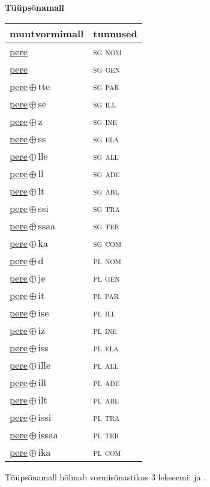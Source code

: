 

\vspace{3.5em}
\noindent \begin{minipage}{\textwidth}
\noindent \textbf{Tüüpsõnamall \,}\\

\begin{sideways}
\begin{tabular}{l l}
muutvormimall & tunnused \\
\hline
\underline{pere} & \textsc{ sg nom } \\
\underline{pere} & \textsc{ sg gen } \\
\underline{pere}\,$\oplus$\,tte & \textsc{ sg par } \\
\underline{pere}\,$\oplus$\,se & \textsc{ sg ill } \\
\underline{pere}\,$\oplus$\,z & \textsc{ sg ine } \\
\underline{pere}\,$\oplus$\,ss & \textsc{ sg ela } \\
\underline{pere}\,$\oplus$\,lle & \textsc{ sg all } \\
\underline{pere}\,$\oplus$\,ll & \textsc{ sg ade } \\
\underline{pere}\,$\oplus$\,lt & \textsc{ sg abl } \\
\underline{pere}\,$\oplus$\,ssi & \textsc{ sg tra } \\
\underline{pere}\,$\oplus$\,ssaa & \textsc{ sg ter } \\
\underline{pere}\,$\oplus$\,ka & \textsc{ sg com } \\
\underline{pere}\,$\oplus$\,d & \textsc{ pl nom } \\
\underline{pere}\,$\oplus$\,je & \textsc{ pl gen } \\
\underline{pere}\,$\oplus$\,it & \textsc{ pl par } \\
\underline{pere}\,$\oplus$\,ise & \textsc{ pl ill } \\
\underline{pere}\,$\oplus$\,iz & \textsc{ pl ine } \\
\underline{pere}\,$\oplus$\,iss & \textsc{ pl ela } \\
\underline{pere}\,$\oplus$\,ille & \textsc{ pl all } \\
\underline{pere}\,$\oplus$\,ill & \textsc{ pl ade } \\
\underline{pere}\,$\oplus$\,ilt & \textsc{ pl abl } \\
\underline{pere}\,$\oplus$\,issi & \textsc{ pl tra } \\
\underline{pere}\,$\oplus$\,issaa & \textsc{ pl ter } \\
\underline{pere}\,$\oplus$\,ika & \textsc{ pl com } \\
\end{tabular}
\end{sideways}
\label{tab:tüüpsõnamall-pere}

\end{minipage}

 
\vspace{1em}
\noindent Tüüpsõnamall  hõlmab vormisõnastikus 3 lekseemi:  ja .
